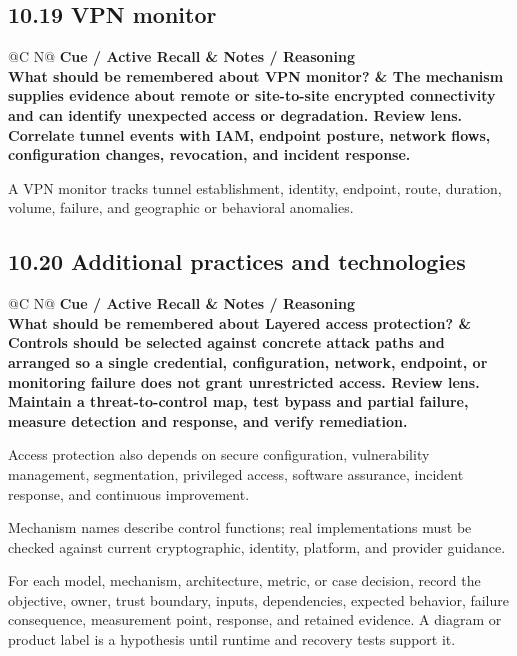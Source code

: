 \documentclass[11pt]{article}
\newcommand{\CornellHeader}{\rowcolor{Navy}\color{white}\bfseries Cue / Active Recall & \color{white}\bfseries Notes / Reasoning \\\endhead}
\newcommand{\CornellRow}[2]{\cellcolor{CueGray}\textbf{#1} & #2 \\\addlinespace[3pt]}
\begin{document}
\subsection{10.19 VPN monitor}
\begin{longtable}{@{}C N@{}}
\CornellHeader
\CornellRow{What should be remembered about VPN monitor?}{The mechanism supplies evidence about remote or site-to-site encrypted connectivity and can identify unexpected access or degradation. \textbf{Review lens.} Correlate tunnel events with IAM, endpoint posture, network flows, configuration changes, revocation, and incident response.}
\end{longtable}
\begin{sectionsummarybox}
A VPN monitor tracks tunnel establishment, identity, endpoint, route, duration, volume, failure, and geographic or behavioral anomalies.
\end{sectionsummarybox}
\subsection{10.20 Additional practices and technologies}
\begin{longtable}{@{}C N@{}}
\CornellHeader
\CornellRow{What should be remembered about Layered access protection?}{Controls should be selected against concrete attack paths and arranged so a single credential, configuration, network, endpoint, or monitoring failure does not grant unrestricted access. \textbf{Review lens.} Maintain a threat-to-control map, test bypass and partial failure, measure detection and response, and verify remediation.}
\end{longtable}
\begin{sectionsummarybox}
Access protection also depends on secure configuration, vulnerability management, segmentation, privileged access, software assurance, incident response, and continuous improvement.
\end{sectionsummarybox}
\begin{scopenotebox}
Mechanism names describe control functions; real implementations must be checked against current cryptographic, identity, platform, and provider guidance.
\end{scopenotebox}
\begin{practicebox}
For each model, mechanism, architecture, metric, or case decision, record the objective, owner, trust boundary, inputs, dependencies, expected behavior, failure consequence, measurement point, response, and retained evidence. A diagram or product label is a hypothesis until runtime and recovery tests support it.
\end{practicebox}
\end{document}

